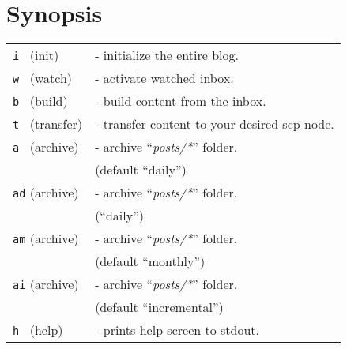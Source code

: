 \section {Synopsis}
{\quotation \begin{tabular}{ll}
\texttt{i } (init)&- initialize the entire blog.\\
\texttt{w } (watch)&- activate watched inbox.\\
\texttt{b } (build)&- build content from the inbox.\\
\texttt{t } (transfer)&- transfer content to your desired scp node.\\
\texttt{a } (archive)&- archive ``{\em posts/*}'' folder.\\
&(default ``daily'')\\
\texttt{ad} (archive)&- archive ``{\em posts/*}'' folder.\\
&(``daily'')\\
\texttt{am} (archive)&- archive ``{\em posts/*}'' folder.\\
&(default ``monthly'')\\
\texttt{ai} (archive)&- archive ``{\em posts/*}'' folder.\\
&(default ``incremental'')\\
\texttt{h } (help)&- prints help screen to stdout.\\
\end{tabular}}
\newline
